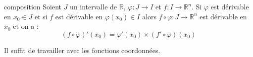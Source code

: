 \documentclass[french,11pt,twoside]{VcCours}
\newenvironment{ApplicationDirecte}{\textbf{Application directe du cours :}

}{}
\begin{document}
%
%
%
%

\begin{Proposition}{composition} Soient $J$ un intervalle de $\mathbb{R}$, $\varphi : J \rightarrow I$ et $f : I \rightarrow \mathbb{R}^n$. Si $\varphi$ est dérivable en $x_0 \in J$ et si $f$ est dérivable en $\varphi(x_0) \in I$ alors $f \circ \varphi : J \rightarrow \mathbb{R}^n$ est dérivable en $x_0$ et on a :
$$ (f \circ \varphi)'(x_0) = \varphi'(x_0) \times (f' \circ \varphi)(x_0)$$
\end{Proposition}

\begin{Demonstration}{} Il suffit de travailler avec les fonctions coordonnées.
\end{Demonstration}

\end{document}
